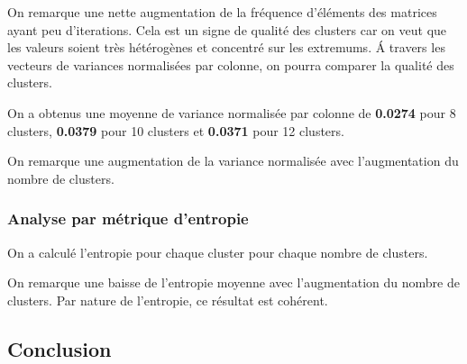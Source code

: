 \documentclass[french,a4paper,18pt]{article}
\begin{document}
On remarque une nette augmentation de la fréquence d'éléments des matrices ayant peu d'iterations.
Cela est un signe de qualité des clusters car on veut que les valeurs soient très hétérogènes 
et concentré sur les extremums.
Á travers les vecteurs de variances normalisées par colonne, on pourra comparer la qualité des clusters.

On a obtenus une moyenne de variance normalisée par colonne de \textbf{0.0274} pour 8 clusters, \textbf{0.0379} pour 10 clusters et \textbf{0.0371} pour 12 clusters.

On remarque une augmentation de la variance normalisée avec l'augmentation du nombre de clusters.

\subsubsection{Analyse par métrique d'entropie}

On a calculé l'entropie pour chaque cluster pour chaque nombre de clusters.


\begin{table}[htbp]
    \centering
    \label{tab:entropies}
    \small %
    \caption{Entropies pour différentes valeurs de $k$}
\end{table}

On remarque une baisse de l'entropie moyenne avec l'augmentation du nombre de clusters.
Par nature de l'entropie, ce résultat est cohérent.

\subsection{Conclusion}
\end{document}
